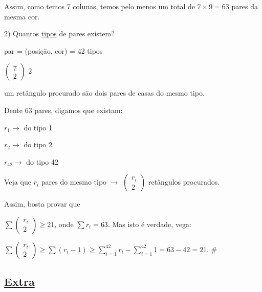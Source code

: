 \documentclass[a4paper,12pt]{article}
\renewcommand{\geq}{\ensuremath{\geqslant}}
\theoremstyle{plain} %
\theoremstyle{definition} %
\theoremstyle{remark} %
\begin{document}
\begin{framed}
		Assim, como temos 7 colunas, temos pelo menos um total de $7\times 9=63$ pares da mesma cor.
		
		2) Quantos \underline{tipos} de pares existem?
		
		\begin{center}
			par = (posi\c{c}\=ao, cor) = 42 tipos
			
			$\left(\begin{smallmatrix}
				7\\
				2
			\end{smallmatrix}\right)$ \hspace{2ex} 2
		\end{center}
		
		um ret\^angulo procurado s\=ao dois pares de casas do mesmo tipo.
		
		Dente 63 pares, digamos que existam:
		
		\begin{center}
			
			$r_1\rightarrow$ do tipo 1
			
			$r_2\rightarrow$ do tipo 2
			
			$r_{42}\rightarrow$ do tipo 42  
		\end{center}
		
		Veja que $r_i$ pares do mesmo tipo $\rightarrow$ $\left(\begin{smallmatrix}
			r_i\\
			2
		\end{smallmatrix}\right)$ ret\^angulos procurados.
		
		Assim, bosta provar que
		
		$\sum \left(\begin{smallmatrix}
			r_i\\
			2
		\end{smallmatrix}\right) \geq 21$, onde $\sum r_i=63$. Mas isto \'e verdade, vega:
		
		$\sum \left(\begin{smallmatrix}
			r_i\\
			2
		\end{smallmatrix}\right) \geq \sum (r_i-1) \geq \sum\limits_{i=1}^{42} r_i-\sum\limits_{i=1}^{42} 1=63-42=21$. \huge \#
	\end{framed}
	
	
	\normalsize
	
	\subsection*{\underline{\textasteriskcentered Extra}}
	
\end{document}
